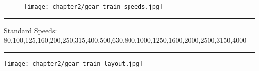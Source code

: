 
\vspace{-.5cm}

\begin{figure}[h]
    \centering
    \texttt{[image: chapter2/gear\_train\_speeds.jpg]}
\end{figure}

\rule{1.08\textwidth}{0.5pt}
\footnotesize Standard Speeds: 80,100,125,160,200,250,315,400,500,630,800,1000,1250,1600,2000,2500,3150,4000
\rule{1.08\textwidth}{0.5pt}

\vspace{.5cm}

\texttt{[image: chapter2/gear\_train\_layout.jpg]}
